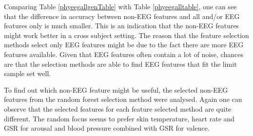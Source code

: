 Comparing Table \ref{phyeegallgenTable} with Table \ref{phyeegalltable}, one can see that the difference in accuracy between non-EEG features and all and/or EEG features only is much smaller. This is an indication that the non-EEG features might work better in a cross subject setting. The reason that the feature selection methods select only EEG features might be due to the fact there are more EEG features available. Given that EEG features often contain a lot of noise, chances are that the selection methods are able to find EEG features that fit the limit sample set well. 

\npar

To find out which non-EEG feature might be useful, the selected non-EEG features from the random forest selection method were analysed. Again one can observe that the selected features for each feature selected method are quite different. The random focus seems to prefer skin temperature, heart rate and GSR for arousal and blood pressure combined with GSR for valence.

\clearpage

